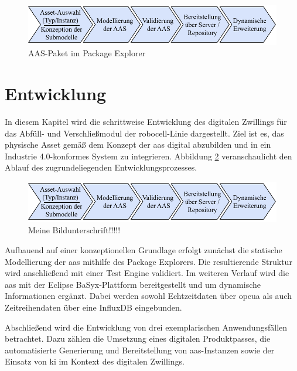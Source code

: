 \newpage
\begin{figure}[htbp]
    \centering
    \includegraphics[width=1\textwidth]{Bilder/vorgehenEntwicklungsteil.pdf}
    \caption{AAS-Paket im Package Explorer}
    \label{fig:NeuesAASPaket}
\end{figure}


\newpage
\section{Entwicklung}
In diesem Kapitel wird die schrittweise Entwicklung des digitalen Zwillings für das Abfüll- und Verschließmodul der robocell-Linie dargestellt.
Ziel ist es, das physische Asset gemäß dem Konzept der \acs{aas} digital abzubilden und in ein Industrie 4.0-konformes System zu integrieren.
Abbildung \ref{fig:Entwicklungsschritte} veranschaulicht den Ablauf des zugrundeliegenden Entwicklungsprozesses.

\begin{figure}[htbp]
    \centering
    \includegraphics[width=1\textwidth]{Bilder/vorgehenEntwicklungsteil.pdf}
    \caption{Meine Bildunterschrift!!!!!}
    \label{fig:Entwicklungsschritte}
\end{figure}
\vspace{-1em}

Aufbauend auf einer konzeptionellen Grundlage erfolgt zunächst die statische Modellierung der \acs{aas} mithilfe des Package Explorers. 
Die resultierende Struktur wird anschließend mit einer Test Engine validiert.
Im weiteren Verlauf wird die \acs{aas} mit der Eclipse BaSyx-Plattform bereitgestellt und um dynamische Informationen ergänzt. 
Dabei werden sowohl Echtzeitdaten über \acs{opcua} als auch Zeitreihendaten über eine InfluxDB eingebunden.

Abschließend wird die Entwicklung von drei exemplarischen Anwendungsfällen betrachtet. 
Dazu zählen die Umsetzung eines digitalen Produktpasses, die automatisierte Generierung und Bereitstellung von \acs{aas}-Instanzen sowie der Einsatz von \acs{ki} im Kontext des digitalen Zwillings.


